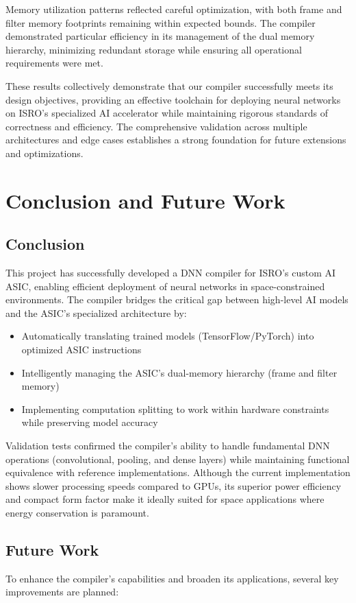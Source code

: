 \documentclass[12pt]{report}
\begin{document}
Memory utilization patterns reflected careful optimization, with both frame and filter memory footprints remaining within expected bounds. The compiler demonstrated particular efficiency in its management of the dual memory hierarchy, minimizing redundant storage while ensuring all operational requirements were met.

These results collectively demonstrate that our compiler successfully meets its design objectives, providing an effective toolchain for deploying neural networks on ISRO's specialized AI accelerator while maintaining rigorous standards of correctness and efficiency. The comprehensive validation across multiple architectures and edge cases establishes a strong foundation for future extensions and optimizations.
\chapter{Conclusion and Future Work}

\section{Conclusion}
This project has successfully developed a DNN compiler for ISRO's custom AI ASIC, enabling efficient deployment of neural networks in space-constrained environments. The compiler bridges the critical gap between high-level AI models and the ASIC's specialized architecture by:

\begin{itemize}
    \item Automatically translating trained models (TensorFlow/PyTorch) into optimized ASIC instructions
    \item Intelligently managing the ASIC's dual-memory hierarchy (frame and filter memory)
    \item Implementing computation splitting to work within hardware constraints while preserving model accuracy
\end{itemize}

Validation tests confirmed the compiler's ability to handle fundamental DNN operations (convolutional, pooling, and dense layers) while maintaining functional equivalence with reference implementations. Although the current implementation shows slower processing speeds compared to GPUs, its superior power efficiency and compact form factor make it ideally suited for space applications where energy conservation is paramount.

\section{Future Work}
To enhance the compiler's capabilities and broaden its applications, several key improvements are planned:
\end{document}
